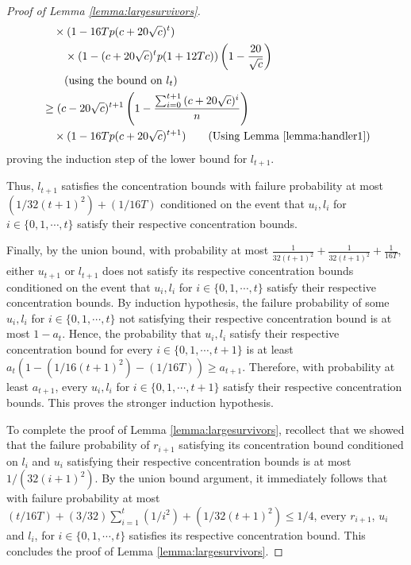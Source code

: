 \documentclass[11pt]{article}
\begin{document}
\begin{proof}[Proof of Lemma \ref{lemma:largesurvivors}]
\begin{align*}
&\ \ \ \times(1-16Tp(c+20\sqrt{c})^t)\\
&\quad \quad \times (1-(c+20\sqrt{c})^tp(1+12Tc))\left(1-\frac{20}{\sqrt{c}}\right)\\&\ \ \ \quad \text{(using the bound on $l_t$)}\\
&\geq (c-20\sqrt{c})^{t+1}\left(1-\frac{\sum_{i=0}^{t+1} {(c+20\sqrt{c})^i}}{n}\right)\\
&\ \ \ \times(1-16Tp(c+20\sqrt{c})^{t+1}) \quad \quad \text{(Using Lemma \ref{lemma:handler1})}
\end{align*}
proving the induction step of the lower bound for $l_{t+1}$.

Thus, $l_{t+1}$ satisfies the concentration bounds with failure probability at most $(1/32(t+1)^2)+(1/16T)$ conditioned on the event that $u_i,l_i$ for $i\in\{0,1,\cdots,t\}$ satisfy their respective concentration bounds.

Finally, by the union bound, with probability at most $\frac{1}{32(t+1)^2}+\frac{1}{32(t+1)^2}+\frac{1}{16T}$, either $u_{t+1}$ or $l_{t+1}$ does not satisfy its respective concentration bounds conditioned on the event that $u_i,l_i$ for $i\in\{0,1,\cdots,t\}$ satisfy their respective concentration bounds. By induction hypothesis, the failure probability of some $u_i,l_i$ for $i\in\{0,1,\cdots,t\}$ not satisfying their respective concentration bound is at most $1-a_t$. Hence, the probability that  $u_i,l_i$ satisfy their respective concentration bound for every $i\in \{0,1,\cdots,t+1\}$ is at least $a_t(1-(1/16(t+1)^2)-(1/16T))\geq a_{t+1}$. Therefore, with probability at least $a_{t+1}$, every $u_i,l_i$ for $i\in\{0,1,\cdots,t+1\}$ satisfy their respective concentration bounds. This proves the stronger induction hypothesis.

To complete the proof of Lemma \ref{lemma:largesurvivors}, recollect that we showed that the failure probability of $r_{i+1}$ satisfying its concentration bound conditioned on $l_i$ and $u_i$ satisfying their respective concentration bounds is at most $1/(32(i+1)^2)$. By the union bound argument, it immediately follows that with failure probability at most $(t/16T)+(3/32)\sum_{i=1}^{t}(1/i^2)+(1/32(t+1)^2)\leq 1/4$, every $r_{i+1}$, $u_i$ and $l_i$, for $i\in\{0,1,\cdots,t\}$ satisfies its respective concentration bound. This concludes the proof of Lemma \ref{lemma:largesurvivors}.
\end{proof}
\end{document}

